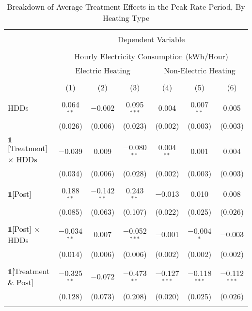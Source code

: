 
\begin{table}[!htbp] \centering 
  \caption{Breakdown of Average Treatment Effects in the Peak Rate Period, By Heating Type} 
  \label{Table:Breakdown-of-Average-Treatment-Effects-in-the-Peak-Rate-Period} 
\small 
\begin{tabular}{@{\extracolsep{20pt}}lcccccc} 
\\[-1.8ex]\hline 
\hline \\[-1.8ex] 
 & \multicolumn{6}{c}{Dependent Variable} \\ 
\cline{2-7} 
\\[-1.8ex] & \multicolumn{6}{c}{Hourly Electricity Consumption  (kWh/Hour)} \\ 
 & \multicolumn{3}{c}{Electric Heating} & \multicolumn{3}{c}{Non-Electric Heating} \\ 
\\[-1.8ex] & (1) & (2) & (3) & (4) & (5) & (6)\\ 
\hline \\[-1.8ex] 
 HDDs & 0.064$^{**}$ & $-$0.002 & 0.095$^{***}$ & 0.004 & 0.007$^{**}$ & 0.005 \\ 
  & (0.026) & (0.006) & (0.023) & (0.002) & (0.003) & (0.003) \\ 
  & & & & & & \\ 
 $\mathbb{1}$[Treatment] $\times$ HDDs & $-$0.039 & 0.009 & $-$0.080$^{**}$ & 0.004$^{**}$ & 0.001 & 0.004 \\ 
  & (0.034) & (0.006) & (0.028) & (0.002) & (0.003) & (0.003) \\ 
  & & & & & & \\ 
 $\mathbb{1}$[Post] & 0.188$^{**}$ & $-$0.142$^{**}$ & 0.243$^{**}$ & $-$0.013 & 0.010 & 0.008 \\ 
  & (0.085) & (0.063) & (0.107) & (0.022) & (0.025) & (0.026) \\ 
  & & & & & & \\ 
 $\mathbb{1}$[Post] $\times$ HDDs & $-$0.034$^{**}$ & 0.007 & $-$0.052$^{***}$ & $-$0.001 & $-$0.004$^{*}$ & $-$0.003 \\ 
  & (0.014) & (0.006) & (0.006) & (0.002) & (0.002) & (0.002) \\ 
  & & & & & & \\ 
 $\mathbb{1}$[Treatment \& Post] & $-$0.325$^{**}$ & $-$0.072 & $-$0.473$^{**}$ & $-$0.127$^{***}$ & $-$0.118$^{***}$ & $-$0.112$^{***}$ \\ 
  & (0.128) & (0.073) & (0.208) & (0.020) & (0.025) & (0.026) \\ 
  & & & & & & \\ 

\end{tabular}
\end{table}
